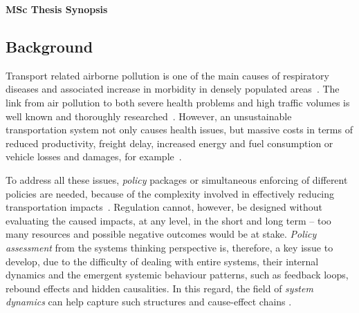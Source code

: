 \documentclass[a4paper,fontsize=10pt,bibliography=totoc]{scrartcl}
\newcommand{\titlemake}[1]{%
		\begin{center}
				\Large\sffamily\bfseries{#1}
		\end{center}
}
\newcommand{\subtitlemake}[1]{%
	\begin{center}
		\begingroup
			\large\sffamily{#1}
		\endgroup
	\end{center}
}
\begin{document}
\pagestyle{fancy}
\fancyhf{} %
\rhead{\footnotesize \today}
\rfoot{\footnotesize \thepage}

\titlemake{ %
MSc Thesis Synopsis
}

\begin{multicols}{2}

\section{Background}
\label{s:background}
Transport related airborne pollution is one of the main causes of respiratory diseases and associated increase in morbidity in densely populated areas~\parencite{vimercati2011_Trafficrelatedair,who2006_Airqualityguidelines}. The link from air pollution to both severe health problems and high traffic volumes is well known and thoroughly researched~\parencite{who2006_Airqualityguidelines}. However, an unsustainable transportation system not only causes health issues, but massive costs in terms of reduced productivity, freight delay, increased energy and fuel consumption or vehicle losses and damages, for example~\parencite{li-zeng2012_SocialCostTraffic}.

To address all these issues, \textit{policy} packages or simultaneous enforcing of different policies are needed, because of the complexity involved in effectively reducing transportation impacts~\parencite[ch. 3, p. 45]{garciasierra2014_Travelbehaviourenvironmental}. Regulation cannot, however, be designed without evaluating the caused impacts, at any level, in the short and long term -- too many resources and possible negative outcomes would be at stake. \textit{Policy assessment} from the systems thinking perspective is, therefore, a key issue to develop, due to the difficulty of dealing with entire systems, their internal dynamics and the emergent systemic behaviour patterns, such as feedback loops, rebound effects and hidden causalities. In this regard, the field of \textit{system dynamics} can help capture such structures and cause-effect chains \parencite{hjorth2006_Navigatingtowardssustainable}.


\end{multicols}
\end{document}
